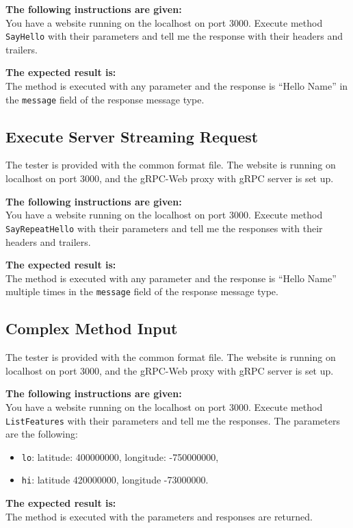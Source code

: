 \textbf{The following instructions are given:}\\
You have a website running on the localhost on port 3000.
Execute method \texttt{SayHello} with their parameters and tell me the response with their headers and trailers.

\textbf{The expected result is:}\\
The method is executed with any parameter
and the response is \enquote{Hello Name} in the \texttt{message} field of the response message type.

\subsection{Execute Server Streaming Request}
The tester is provided with the common format file.
The website is running on localhost on port 3000, and the gRPC-Web proxy with gRPC server is set up.

\textbf{The following instructions are given:}\\
You have a website running on the localhost on port 3000.
Execute method \texttt{SayRepeatHello} with their parameters and tell me the responses with their headers and trailers.

\textbf{The expected result is:}\\
The method is executed with any parameter
and the response is \enquote{Hello Name} multiple times in the \texttt{message} field of the response message type.

\subsection{Complex Method Input}
The tester is provided with the common format file.
The website is running on localhost on port 3000, and the gRPC-Web proxy with gRPC server is set up.

\textbf{The following instructions are given:}\\
You have a website running on the localhost on port 3000.
Execute method \texttt{ListFeatures} with their parameters and tell me the responses.
The parameters are the following:
\begin{itemize}
    \item \texttt{lo}: latitude: 400000000, longitude: -750000000,
    \item \texttt{hi}: latitude 420000000, longitude -73000000.
\end{itemize}

\textbf{The expected result is:}\\
The method is executed with the parameters and responses are returned.

